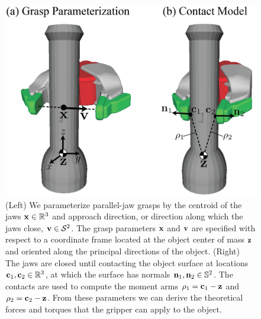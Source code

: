 \begin{figure}[t!]
\centering
\includegraphics[scale=0.4]{figures/illustrations/dexnet_grasping_model.png}
\caption{(Left) We parameterize parallel-jaw grasps by the centroid of the jaws $\mathbf{x} \in \mathbb{R}^3$ and approach direction, or direction along which the jaws close, $\mathbf{v} \in \mathcal{S}^2$. The grasp parameters $\mathbf{x}$ and $\mathbf{v}$ are specified with respect to a coordinate frame located at the object center of mass $\mathbf{z}$ and oriented along the principal directions of the object. (Right) The jaws are closed until contacting the object surface at locations $\mathbf{c}_1, \mathbf{c}_2 \in \mathbb{R}^3$, at which the surface has normals $\mathbf{n}_1, \mathbf{n}_2 \in \mathbb{S}^2$. The contacts are used to compute the moment arms $\rho_1 = \mathbf{c}_1 - \mathbf{z}$ and $\rho_2  = \mathbf{c}_2 - \mathbf{z}$. From these parameters we can derive the theoretical forces and torques that the gripper can apply to the object. }
\vspace*{-15pt}
\end{figure}



